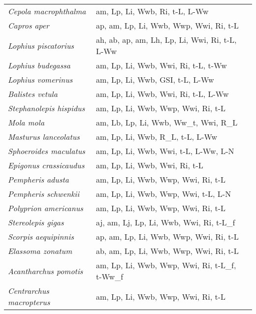 {\begin{longtable}[c]{p{3.5cm}p{5.5cm}p{5.5cm}}
\emph{Cepola macrophthalma} &  am, Lp, Li, Wwb, Ri, t-L, L-Ww & \citet{SterEcon1992,RodrAlem2017} \\
\emph{Capros aper} &  ap, am, Lp, Li, Wwb, Wwp, Wwi, Ri, t-L & \citet{HussCoad2012} \\
\emph{Lophius piscatorius} &  ah, ab, ap, am, Lh, Lp, Li, Wwi, Ri, t-L, L-Ww & \citet{HislGall2001,OfstAngu2013,Dore1986} \\
\emph{Lophius budegassa} &  am, Lp, Li, Wwb, Wwi, Ri, t-L, t-Ww & \citet{LandPere2001} \\
\emph{Lophius vomerinus} &  am, Lp, Li, Wwb, GSI, t-L, L-Ww & \citet{MaarBoot1999} \\
\emph{Balistes vetula} &  am, Lp, Li, Wwb, Wwi, Ri, t-L, L-Ww & \citet{MacK2008,AlbuMart2011} \\
\emph{Stephanolepis hispidus} &  am, Lp, Li, Wwb, Wwp, Wwi, Ri, t-L & \citet{MancCast2015,MancCast2004} \\
\emph{Mola mola} &  am, Lb, Lp, Li, Wwb, Ww\_t, Wwi, R\_L & \citet{PopeHays2010,Schm1921} \\
\emph{Masturus lanceolatus} &  am, Lp, Li, Wwb, R\_L, t-L, L-Ww & \citet{PopeHays2010,LiuaLeea2009} \\
\emph{Sphoeroides maculatus} &  am, Lp, Li, Wwb, Wwi, t-L, L-Ww, L-N & \citet{Lycz1971,MerrLaro1977} \\
\emph{Epigonus crassicaudus} &  am, Lp, Li, Wwb, Wwi, Ri, t-L & \citet{ContArel2013,OkamMoto2011} \\
\emph{Pempheris adusta} &  am, Lp, Li, Wwb, Wwp, Wwi, Ri, t-L & \citet{KoedIshi2016,KoedFuka2013} \\
\emph{Pempheris schwenkii} &  am, Lp, Li, Wwb, Wwp, Wwi, t-L, L-N & \citet{KoedIshi2016,KoedIshi2012,KoedFuka2013} \\
\emph{Polyprion americanus} &  am, Lp, Li, Wwb, Wwp, Wwi, Ri, t-L & \citet{PereHaim2004,PaPaPele2018} \\
\emph{Stereolepis gigas} &  aj, am, Lj, Lp, Li, Wwb, Wwi, Ri, t-L\_f & \citet{BensAlle2018,HawkAlle2014} \\
\emph{Scorpis aequipinnis} &  ap, am, Lp, Li, Wwb, Wwp, Wwi, Ri, t-L & \citet{CoulPott2012} \\
\emph{Elassoma zonatum} &  ab, am, Lp, Li, Wwb, Wwp, Wwi, Ri, t-L &  \\
\emph{Acantharchus pomotis} &  am, Lp, Li, Wwb, Wwp, Wwi, Ri, t-L\_f, t-Ww\_f & \citet{Pard1993} \\
\emph{Centrarchus macropterus} &  am, Lp, Li, Wwb, Wwp, Wwi, Ri, t-L &  \\

\end{longtable}}
